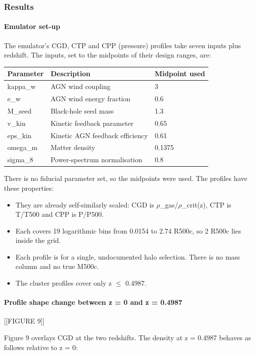 \documentclass[11pt,a4paper]{article}
\begin{document}
\subsubsection*{Results}
\paragraph{Emulator set-up}
The emulator's CGD, CTP and CPP (pressure) profiles take seven inputs plus redshift. The inputs, set to the midpoints of their design ranges, are:

\begin{longtable}{@{}p{}p{}p{}@{}}
\toprule
\textbf{Parameter} & \textbf{Description} & \textbf{Midpoint used} \\ \midrule \endhead
kappa\_w & AGN wind coupling & 3 \\
e\_w & AGN wind energy fraction & 0.6 \\
M\_seed & Black-hole seed mass & 1.3 \\
v\_kin & Kinetic feedback parameter & 0.65 \\
eps\_kin & Kinetic AGN feedback efficiency & 0.61 \\
omega\_m & Matter density & 0.1375 \\
sigma\_8 & Power-spectrum normalisation & 0.8 \\
\bottomrule\end{longtable}
There is no fiducial parameter set, so the midpoints were used. The profiles have these properties:

\begin{itemize}
  \item They are already self-similarly scaled: CGD is $\rho$\_gas/$\rho$\_crit(z), CTP is T/T500 and CPP is P/P500.
  \item Each covers 19 logarithmic bins from 0.0154 to 2.74 R500c, so 2 R500c lies inside the grid.
  \item Each profile is for a single, undocumented halo selection. There is no mass column and no true M500c.
  \item The cluster profiles cover only z $\leq$ 0.4987.
\end{itemize}
\paragraph{Profile shape change between z = 0 and z = 0.4987}
[[FIGURE 9]]

Figure 9 overlays CGD at the two redshifts. The density at z = 0.4987 behaves as follows relative to z = 0:
\end{document}
